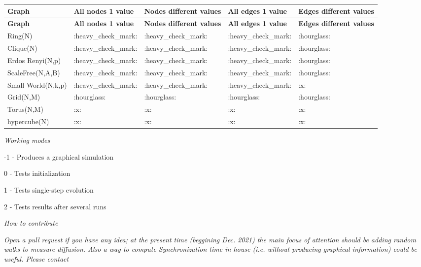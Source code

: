 \tabulinesep=1mm
\begin{longtabu} spread 0pt [c]{*{5}{|X[-1]}|}
\hline
\rowcolor{\tableheadbgcolor}\textbf{ Graph }&\textbf{ All nodes 1 value }&\textbf{ Nodes different values }&\textbf{ All edges 1 value }&\textbf{ Edges different values  }\\
\endfirsthead
\hline
\endfoot
\hline
\rowcolor{\tableheadbgcolor}\textbf{ Graph }&\textbf{ All nodes 1 value }&\textbf{ Nodes different values }&\textbf{ All edges 1 value }&\textbf{ Edges different values  }\\
\endhead
Ring(\+N) &\+:heavy\+\_\+check\+\_\+mark\+: &\+:heavy\+\_\+check\+\_\+mark\+: &\+:heavy\+\_\+check\+\_\+mark\+: &\+:hourglass\+: \\
Clique(\+N) &\+:heavy\+\_\+check\+\_\+mark\+: &\+:heavy\+\_\+check\+\_\+mark\+: &\+:heavy\+\_\+check\+\_\+mark\+: &\+:hourglass\+: \\
Erdos Renyi(\+N,p) &\+:heavy\+\_\+check\+\_\+mark\+: &\+:heavy\+\_\+check\+\_\+mark\+: &\+:heavy\+\_\+check\+\_\+mark\+: &\+:hourglass\+: \\
Scale\+Free(\+N,\+A,\+B) &\+:heavy\+\_\+check\+\_\+mark\+: &\+:heavy\+\_\+check\+\_\+mark\+: &\+:heavy\+\_\+check\+\_\+mark\+: &\+:hourglass\+: \\
Small World(\+N,k,p) &\+:heavy\+\_\+check\+\_\+mark\+: &\+:heavy\+\_\+check\+\_\+mark\+: &\+:heavy\+\_\+check\+\_\+mark\+: &\+:x\+: \\
Grid(\+N,\+M) &\+:hourglass\+: &\+:hourglass\+: &\+:hourglass\+: &\+:hourglass\+: \\
Torus(\+N,\+M) &\+:x\+: &\+:x\+: &\+:x\+: &\+:x\+: \\
hypercube(\+N) &\+:x\+: &\+:x\+: &\+:x\+: &\+:x\+: \\
\end{longtabu}


\begin{center}{\itshape Working modes}\end{center} 

-\/1 -\/ Produces a graphical simulation

0 -\/ Tests initialization

1 -\/ Tests single-\/step evolution

2 -\/ Tests results after several runs

\begin{center}{\itshape How to contribute}\end{center}  {\itshape Open a pull request if you have any idea; at the present time (beggining Dec. 2021) the main focus of attention should be adding random walks to measure diffusion. Also a way to compute Synchronization time in-\/house (i.\+e. without producing graphical information) could be useful. Please contact }

